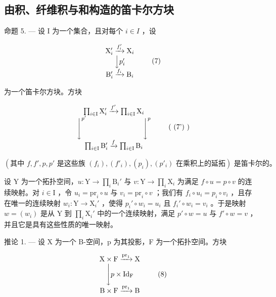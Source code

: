 \subsection{由积、纤维积与和构造的笛卡尔方块}

命题 5. --- 设 I 为一个集合，且对每个 \(i \in I\) ，设

\[
\begin{array}{c} \mathrm{X} _ {i} ^ {\prime} \xrightarrow {f _ {i} ^ {\prime}} \mathrm{X} _ {i} \\ \Big \downarrow p _ {i} ^ {\prime} \\ \mathrm{B} _ {i} ^ {\prime} \xrightarrow {f _ {i}} \mathrm{B} _ {i} \end{array}\tag{7}
\]

为一个笛卡尔方块。方块

\[
\begin{array}{c} \prod_ {i \in \mathrm{I}} \mathrm{X} _ {i} ^ {\prime} \xrightarrow {f ^ {\prime}} \prod_ {i \in \mathrm{I}} \mathrm{X} _ {i} \\ \Biggl \downarrow^ {p ^ {\prime}} \qquad \qquad \qquad \qquad \Biggl \downarrow^ {p} \\ \prod_ {i \in \mathrm{I}} \mathrm{B} _ {i} ^ {\prime} \xrightarrow {f} \prod_ {i \in \mathrm{I}} \mathrm{B} _ {i} \end{array}\tag{ (7') }
\]

\((\text{其中 } f, f', p, p' \text{ 是这些族 } (f_i), (f'_i), (p_i), (p'_i) \text{ 在乘积上的延拓}) \text{ 是笛卡尔的。}\)

设 Y 为一个拓扑空间，\(u \colon \mathrm{Y} \to \prod_{i} \mathrm{B}_{i}'\) 与 \(v \colon \mathrm{Y} \to \prod_{i} \mathrm{X}_{i}\) 为满足 \(f \circ u = p \circ v\) 的连续映射。对 \(i \in \mathrm{I}\) ，令 \(u_{i} = \mathrm{pr}_{i} \circ u\) 与 \(v_{i} = \mathrm{pr}_{i} \circ v\) ；我们有 \(f_{i} \circ u_{i} = p_{i} \circ v_{i}\) ，且存在唯一的连续映射 \(w_{i} \colon \mathrm{Y} \to \mathrm{X}_{i}'\) ，使得 \(p_{i}' \circ w_{i} = u_{i}\) 且 \(f_{i}' \circ w_{i} = v_{i}\) 。于是映射 \(w = (w_{i})\) 是从 Y 到 \(\prod_{i} \mathrm{X}_{i}'\) 中的一个连续映射，满足 \(p' \circ w = u\) 与 \(f' \circ w = v\) ，并且它是具有这些性质的唯一映射。

推论 1. --- 设 X 为一个 B-空间，p 为其投影，F 为一个拓扑空间。方块

\[
\begin{array}{c} \mathrm{X} \times \mathrm{F} \xrightarrow {\operatorname{pr} _ {1}} \mathrm{X} \\ \Biggl \downarrow p \times \mathrm{Id} _ {\mathrm{F}} \\ \mathrm{B} \times \mathrm{F} \xrightarrow {\operatorname{pr} _ {1}} \mathrm{B} \end{array}\tag{8}
\]

